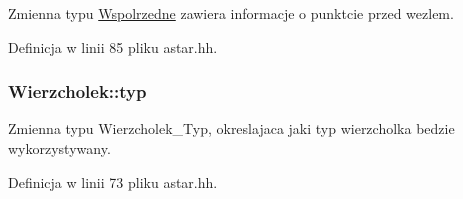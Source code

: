 \-Zmienna typu \hyperlink{struct_wspolrzedne}{\-Wspolrzedne} zawiera informacje o punktcie przed wezlem. 



\-Definicja w linii 85 pliku astar.\-hh.

\hypertarget{struct_wierzcholek_ac812fe482bda5f924cf38d48340aa018}{
\subsubsection[{typ}]{ {\bf \-Wierzcholek\-::typ}}}\label{struct_wierzcholek_ac812fe482bda5f924cf38d48340aa018}


\-Zmienna typu \-Wierzcholek\-\_\-\-Typ, okreslajaca jaki typ wierzcholka bedzie wykorzystywany. 



\-Definicja w linii 73 pliku astar.\-hh.

